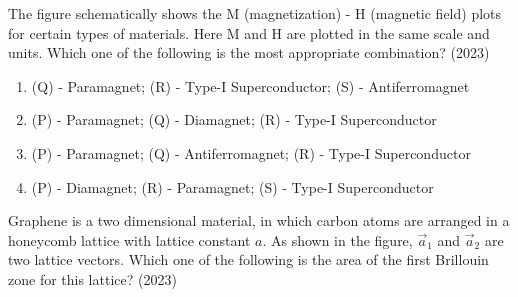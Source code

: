     \item The figure schematically shows the M (magnetization) - H (magnetic field) plots
    for certain types of materials. Here M and H are plotted in the same scale and
    units. Which one of the following is the most appropriate combination? \hfill (2023)
    \begin{figure}[!ht]
        \centering
        \caption{}
    \end{figure}
    \begin{enumerate}[label = (\Alph*)]
        \item (Q) - Paramagnet; (R) - Type-I Superconductor; (S) - Antiferromagnet
        \item (P) - Paramagnet; (Q) - Diamagnet; (R) - Type-I Superconductor
        \item (P) - Paramagnet; (Q) - Antiferromagnet; (R) - Type-I Superconductor
        \item (P) - Diamagnet; (R) - Paramagnet; (S) - Type-I Superconductor
    \end{enumerate}
    \item Graphene is a two dimensional material, in which carbon atoms are arranged in a
    honeycomb lattice with lattice constant $a$. As shown in the figure, $\overrightarrow{a}_1$ and $\overrightarrow{a}_2$
    are two lattice vectors. Which one of the following is the area of the first Brillouin
    zone for this lattice? \hfill (2023)
